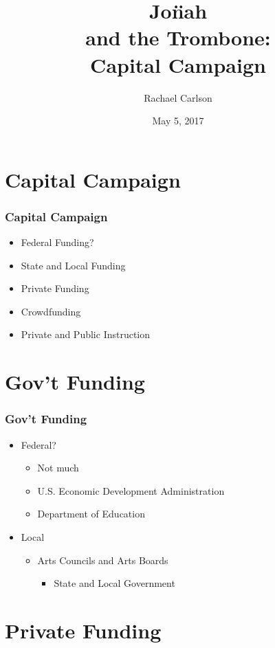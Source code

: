 \documentclass[xetex,14pt]{beamer}
\title{Jon̈ah \\ and the Trombone: \\ Capital Campaign}
\author{Rachael Carlson}
\date{May 5, 2017}
\begin{document}
\frame{\titlepage}

\section{Capital Campaign}
\label{sec:capital-campaign}
\begin{frame}
  \frametitle{Capital Campaign}
  \begin{itemize}
  \item Federal Funding?
  \item State and Local Funding
  \item Private Funding
  \item Crowdfunding
  \item Private and Public Instruction
  \end{itemize}
\end{frame}

\section{Gov't Funding}
\label{sec:govt-funding}

\begin{frame}
  \frametitle{Gov't Funding}
  \begin{itemize}
  \item<1-> Federal?
    \begin{itemize}
    \item<2-> Not much
    \item<2-> U.S. Economic Development Administration
    \item<2-> Department of Education
    \end{itemize}
  \item<3-> Local
    \begin{itemize}
    \item<4-> Arts Councils and Arts Boards
      \begin{itemize}
      \item<4-> State and Local Government
      \end{itemize}
    \end{itemize}
  \end{itemize}
\end{frame}

\section{Private Funding}
\label{sec:private-funding}
\end{document}
